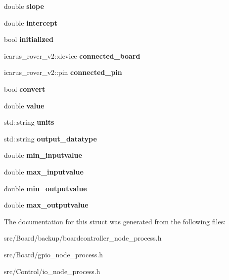 \begin{DoxyCompactItemize}
double {\bfseries slope}
\item 
\mbox{\label{structSensor_aeb1a0eb4a09100ba52800c25358f8354}} 
double {\bfseries intercept}
\item 
\mbox{\label{structSensor_a462167a744038065e67bac536e06dab0}} 
bool {\bfseries initialized}
\item 
\mbox{\label{structSensor_aa3f59b92b20c5fb32a5308e88ca9a660}} 
icarus\+\_\+rover\+\_\+v2\+::device {\bfseries connected\+\_\+board}
\item 
\mbox{\label{structSensor_afacf821b88f9a3baa9b85561036e15f3}} 
icarus\+\_\+rover\+\_\+v2\+::pin {\bfseries connected\+\_\+pin}
\item 
\mbox{\label{structSensor_a1e798d141f94c8ee502fc4ab14841d11}} 
bool {\bfseries convert}
\item 
\mbox{\label{structSensor_a6b22400da2629283b9d3c63049313b71}} 
double {\bfseries value}
\item 
\mbox{\label{structSensor_a4fa67d8f7fffdbd2dd1dca7f5f447783}} 
std\+::string {\bfseries units}
\item 
\mbox{\label{structSensor_adbbd39183cdd191d3c897f6783f22853}} 
std\+::string {\bfseries output\+\_\+datatype}
\item 
\mbox{\label{structSensor_aa9bdd381b4751654a33d80e8620098cf}} 
double {\bfseries min\+\_\+inputvalue}
\item 
\mbox{\label{structSensor_a8c8292530e21981702adc756eea59bc1}} 
double {\bfseries max\+\_\+inputvalue}
\item 
\mbox{\label{structSensor_a6204b4f95987d8d358a0b3a65be05f16}} 
double {\bfseries min\+\_\+outputvalue}
\item 
\mbox{\label{structSensor_a289b5b42c914c467237a00eb9a5006b0}} 
double {\bfseries max\+\_\+outputvalue}
\end{DoxyCompactItemize}


The documentation for this struct was generated from the following files\+:\begin{DoxyCompactItemize}
\item 
src/\+Board/backup/boardcontroller\+\_\+node\+\_\+process.\+h\item 
src/\+Board/gpio\+\_\+node\+\_\+process.\+h\item 
src/\+Control/io\+\_\+node\+\_\+process.\+h\end{DoxyCompactItemize}
